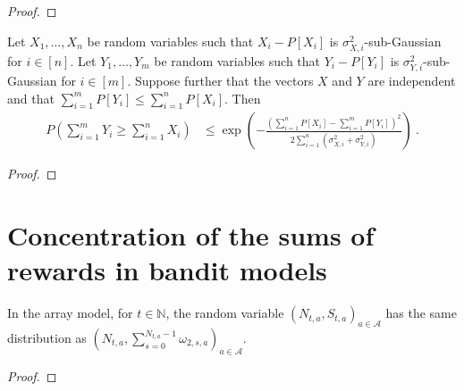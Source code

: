 \begin{proof}\leanok

\end{proof}


\begin{lemma}\label{lem:measure_sum_le_sum_le'}
  \leanok
Let $X_1, \ldots, X_n$ be random variables such that $X_i - P[X_i]$ is $\sigma_{X,i}^2$-sub-Gaussian for $i \in [n]$.
Let $Y_1, \ldots, Y_m$ be random variables such that $Y_i - P[Y_i]$ is $\sigma_{Y,i}^2$-sub-Gaussian for $i \in [m]$.
Suppose further that the vectors $X$ and $Y$ are independent and that $\sum_{i = 1}^m P[Y_i] \le \sum_{i = 1}^n P[X_i]$.
Then
\begin{align*}
  P\left(\sum_{i=1}^m Y_i \ge \sum_{i=1}^n X_i\right)
  &\le \exp\left(- \frac{\left(\sum_{i = 1}^n P[X_i] - \sum_{i=1}^m P[Y_i]\right)^2}{2 \sum_{i=1}^n (\sigma_{X,i}^2 + \sigma_{Y,i}^2)}\right)
  \: .
\end{align*}
\end{lemma}

\begin{proof}\leanok

\end{proof}




\section{Concentration of the sums of rewards in bandit models}


\begin{lemma}\label{lem:AM.identDistrib_pullCount_prod_sumRewards}
In the array model, for $t \in \mathbb{N}$, the random variable $(N_{t,a}, S_{t, a})_{a \in \mathcal{A}}$ has the same distribution as $(N_{t,a}, \sum_{s=0}^{N_{t,a}-1} \omega_{2, s, a})_{a \in \mathcal{A}}$.
\end{lemma}

\begin{proof}\leanok

\end{proof}


